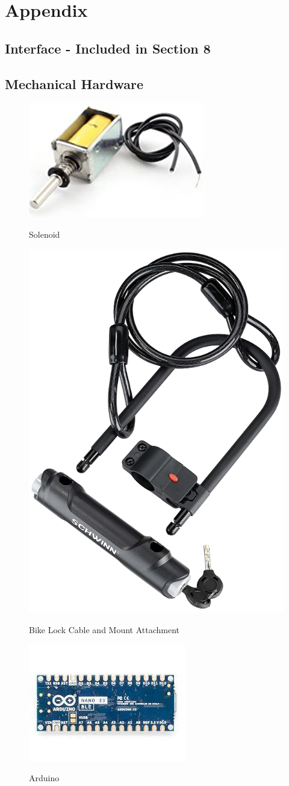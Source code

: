 \documentclass[12pt, titlepage]{article}
\begin{document}

% 

\newpage{}
\section{Appendix}

\subsection{Interface - Included in Section 8}


\subsection{Mechanical Hardware}

 \begin{figure}[ht]
 \begin{center}
 {
  \includegraphics[width=0.4\linewidth]{13.png}
 }
 \caption{\label{Solenoid} Solenoid}
 \end{center}
 \end{figure}
 
  \begin{figure}[ht]
 \begin{center}
 {
  \includegraphics[width=0.2\linewidth]{BikeLock.png}
 }
 \caption{\label{BikeLock} Bike Lock Cable and Mount Attachment}
 \end{center}
 \end{figure}
 
 \begin{figure}[ht]
 \begin{center}
 {
  \includegraphics[width=0.3\linewidth]{arduino.png}
 }
 \caption{\label{Arduino} Arduino}
 \end{center}
 \end{figure}
 \newpage
\end{document}
